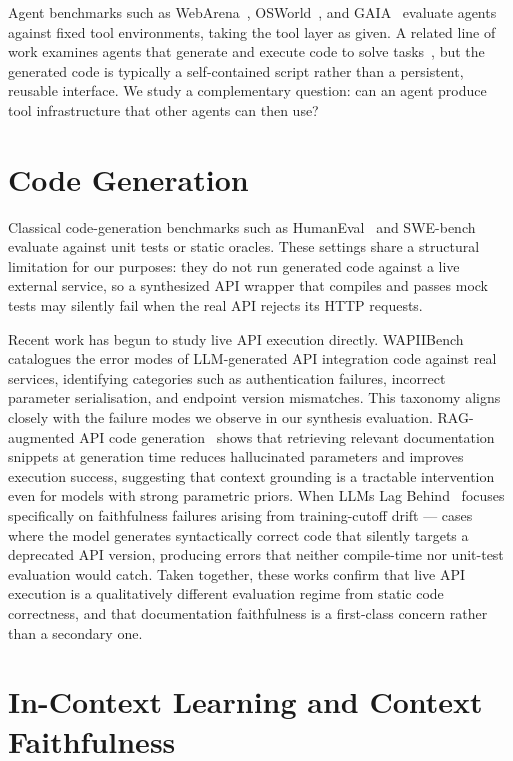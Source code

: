 Agent benchmarks such as WebArena~\citep{webarena2023}, OSWorld~\citep{osworld2024}, and GAIA~\citep{gaia2023} evaluate agents against fixed tool environments, taking the tool layer as given. A related line of work examines agents that generate and execute code to solve tasks~\citep{codeact2024}, but the generated code is typically a self-contained script rather than a persistent, reusable interface. We study a complementary question: can an agent produce tool infrastructure that other agents can then use?

\section{Code Generation}
\label{sec:related_work:code_gen}

Classical code-generation benchmarks such as HumanEval~\citep{chen2021codex} and SWE-bench~\citep{jimenez2023swebench} evaluate against unit tests or static oracles. These settings share a structural limitation for our purposes: they do not run generated code against a live external service, so a synthesized API wrapper that compiles and passes mock tests may silently fail when the real API rejects its HTTP requests.

Recent work has begun to study live API execution directly.
WAPIIBench~\citep{wapiibench2025} catalogues the error modes of LLM-generated API integration code against real services, identifying categories such as authentication failures, incorrect parameter serialisation, and endpoint version mismatches. This taxonomy aligns closely with the failure modes we
observe in our synthesis evaluation. RAG-augmented API code
generation~\citep{ragapidocs2025} shows that retrieving relevant documentation snippets at generation time reduces hallucinated parameters and improves execution success, suggesting that context grounding is a tractable intervention even for models with strong parametric priors. When LLMs Lag Behind~\citep{lagging2025} focuses specifically on faithfulness failures arising from training-cutoff drift --- cases where the model generates syntactically correct code that silently targets a deprecated API version, producing errors that neither compile-time nor unit-test evaluation would catch. Taken together,
these works confirm that live API execution is a qualitatively different evaluation regime from static code correctness, and that documentation faithfulness is a first-class concern rather than a secondary one.

\section{In-Context Learning and Context Faithfulness}
\label{sec:related_work:context}


